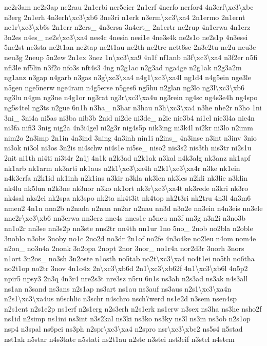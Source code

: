\begin{DoxyCompactItemize}
ne2r3am ne2r3ap ne2rau 2n1erbi ner5eier 2n1erf 4nerfo nerfor4 4n3erf\textbackslash{}xc3\textbackslash{}xbc n3erg 2n1erh 4n3erh\textbackslash{}xc3\textbackslash{}xb6 3ne3ri n1erk n3erm\textbackslash{}xc3\textbackslash{}xa4 2n1ermo 2n1ernt ne1r\textbackslash{}xc3\textbackslash{}xb6s 2n1err n2ers\-\_\- 4n3ersa 3n4ert\-\_\- 2n1ertr ne2rup 4n1erwa 4n1erz 3n2es n4es\-\_\- ne2s\textbackslash{}xc3\textbackslash{}xa4 nes4c 4nesia nesi1e 4ne3s4k ne2s1o ne2s1p 4n3essi 5ne2st ne3sta ne2t1an ne2tap ne2t1au ne2th ne2tre nett6sc 2n3e2tu ne2u neu3c neu3g 2neup 5n2ew 2n1ex 3nez 1n\textbackslash{}xc3\textbackslash{}xa9 4n1f nf1anb n3f\textbackslash{}xc3\textbackslash{}xa4 n3f2er n5fi nfi3le nf5lin n3f2o nfo3s nft4s3 4ng n2g1ac n2g3ad nga4ge n2g1ak n2g3a2m ng1anz n3gap n4garb n3gas n3g\textbackslash{}xc3\textbackslash{}xa4 n4g1\textbackslash{}xc3\textbackslash{}xa4l ng1d4 n4g5ein nge3le n5gen nge5nerw nge4ram n4g5erse n5ges6 ng5hu n2glan ng3lo ng3l\textbackslash{}xc3\textbackslash{}xb6 ng3lu n4gm ng3ne n4g1or ng3rat ng3r\textbackslash{}xc3\textbackslash{}xa4u ng3rein ng4sc ng4s3e4h ng4spo ng5s4tel ng3ts n2gue 6n1h n3ha\-\_\- n3har n3hau n3h\textbackslash{}xc3\textbackslash{}xa4 n3he nhe2r n3ho 1ni 3ni\-\_\- 3ni4a ni5as ni3ba nib3b 2nid ni2de ni3de\-\_\- n2ie nie3b4 ni1el nie3l4a nie4n ni3fa nifi3 3nig nig2a 4n3i4gel ni2g3r nig4s5p nik3ing ni3k4l ni2kr ni3lo n2imm nim2o 2n3imp 2n1in 4n3ind 3ning 4n3inh nin1i n2ins\-\_\- 4n3inse n3int n3inv 3nio ni3ok ni3ol ni3os 3n2is ni4schw ni4s1e ni5se\-\_\- niso2 nis3s2 nis3th nis3tr ni2s1u 2nit ni1th ni4ti ni3t4r 2n1j 4n1k n2k3ad n2k1ak n3kal n4k3alg nk3anz nk1apf nk1arb nk1arm nk3arti nk1aus n2k1\textbackslash{}xc3\textbackslash{}xa4h n2k1\textbackslash{}xc3\textbackslash{}xa4r n3ke nk1ein n4k3erfa n2k1id nk1inh n2k1ins n3kir n3kla nk3len nk3les n2kli nk3lie n3klin nk4lu nk5lun n2k3ne nk3nor n3ko nk1ort nk3r\textbackslash{}xc3\textbackslash{}xa4t nk3rede n3kri nk3ro nk4sal nks2ei nk2spa nk3spo nk2ta nk4t3it nk4top nk2t3ri nk2tru 4n3l 4n3m6 nmen2 4n1n nna2b n2nada n2nan nn2ar n2nau nn3d n3n2e nn3ein n4n3eis nn3ele nne2r\textbackslash{}xc3\textbackslash{}xb6 nn3erwa nn3erz nne4s nnes1e n5neu nn3f nn3g n3n2i n3no3b nn1o2r nn3se nn3s2p nn3ste nns2tr nn4th nn1ur 1no 5no\-\_\- 2nob no2bla n2oble 3noblo n3obs 3noby no1c 2no2d no3dr 2n1of no2fe 4n3o4ke no2leu n4om nom4e n2on\-\_\- no3n4a 2nonk 3n2opa 2nopt 2nor 3nor\-\_\- no1r4a nor2d3r 3norh 3nors n1ort 3n2os\-\_\- no3sh 3n2oste n1osth no5tab no2t\textbackslash{}xc3\textbackslash{}xa4 no4t1ei no5th no6tha no2t1op no2tr 3nov 4n1o4x 2n\textbackslash{}xc3\textbackslash{}xb6d 2n1\textbackslash{}xc3\textbackslash{}xb62f 4n1\textbackslash{}xc3\textbackslash{}xb6l 4n5p2 npir5 npsy3 2n3q 4n3r4 nre2s3t nre3sz n5ru 6n1s ns3ab n2s3ad ns3ak n4s3all ns1an n3sand ns3ans n2s1ap ns3art ns1au ns3auf ns3aus n2s1\textbackslash{}xc3\textbackslash{}xa4n n2s1\textbackslash{}xc3\textbackslash{}xa4us n6schlic n3schr n4schro nsch7werd ns1e2d n3sem nsen4sp n2s1ent n2s1e2p ns1erf n2s1erg n2s3erh n2s1erk ns1erw n3sex ns3ha ns3he nsho2f ns1id n2simp ns1ini ns3int n3s2kal ns3ki ns3ko ns3ky ns3l ns3m ns3ob n2s1op nsp4 n3spal ns6pei ns3ph n2spr\textbackslash{}xc3\textbackslash{}xa4 n2spro nsr\textbackslash{}xc3\textbackslash{}xbc2 ns5s4 n5stad nst1ak n5star n4s3tate n5stati ns2t1au n2ste n3stei nst3eif n3stel n4stem 
\end{DoxyCompactItemize}
